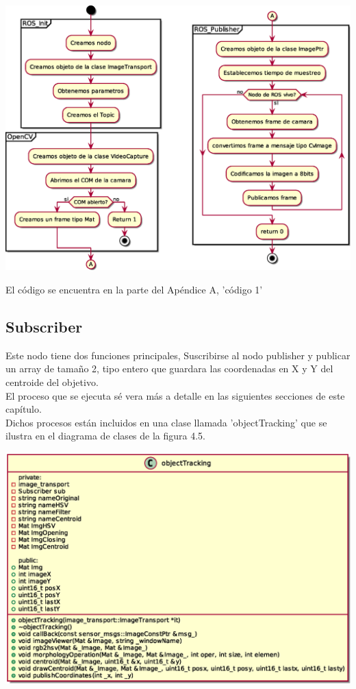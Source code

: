 \begin{center}
	\includegraphics[width=1.0 \textwidth]{Contenido/Cuerpo/Capitulo4/publisher.eps}
	\label{Fig5}
\end{center}
El código se encuentra en la parte del Apéndice A, 'código 1'

\subsection{Subscriber}
Este nodo tiene dos funciones principales, Suscribirse al nodo publisher y publicar
un array de tamaño 2, tipo entero que guardara las coordenadas en X y Y del centroide
del objetivo.\\
El proceso que se ejecuta sé vera más a detalle en las siguientes secciones de este
capítulo.\\
Dichos procesos están incluidos en una clase llamada 'objectTracking' que se ilustra
en el diagrama de clases de la figura 4.5.
\begin{center}
	\includegraphics[width=1.0 \textwidth]{Contenido/Cuerpo/Capitulo4/object_tracking.eps}
	\label{Fig5}
\end{center}


